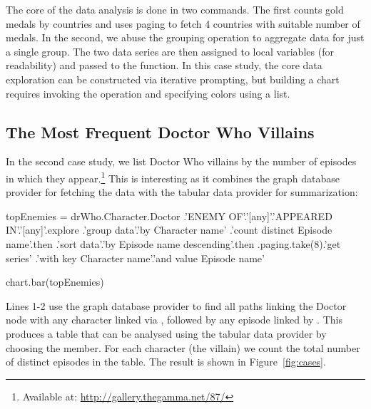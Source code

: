 \documentclass[manuscript,review,anonymous]{acmart}
\begin{document}

The core of the data analysis is done in two commands. The first counts gold medals by countries
and uses paging to fetch 4 countries with suitable number of medals. In the second, we abuse the
grouping operation to aggregate data for just a single group. The two data series are then assigned
to local variables (for readability) and passed to the  function.
In this case study, the core data exploration can be constructed via iterative prompting, but
building a chart requires invoking the  operation and specifying colors using a list.

\subsection{The Most Frequent Doctor Who Villains}
In the second case study, we list Doctor Who villains by the number of episodes in which they
appear.\footnote{Available at: \url{http://gallery.thegamma.net/87/}} This is interesting as it
combines the graph database provider for fetching the data with the tabular data provider for
summarization:

\begin{thegamma}
 topEnemies = drWho.Character.Doctor
  .'ENEMY OF'.'[any]'.'APPEARED IN'.'[any]'.explore
  .'group data'.'by Character name'
    .'count distinct Episode name'.then
  .'sort data'.'by Episode name descending'.then
  .paging.take(8).'get series'
    .'with key Character name'.'and value Episode name'

chart.bar(topEnemies)
\end{thegamma}

Lines 1-2 use the graph database provider to find all paths linking the Doctor node with any
character linked via , followed by any episode linked by .
This produces a table that can be analysed using the tabular data provider by choosing the
 member. For each character (the villain) we count the total number of
distinct episodes in the table. The result is shown in Figure~\ref{fig:cases}.
\end{document}
